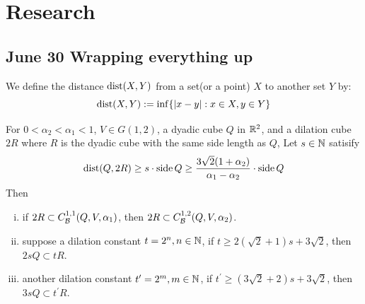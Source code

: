 \section{Research}


\subsection{June 30 Wrapping everything up}
\begin{definition}[Distance]
    We define the distance $\operatorname{dist}(X, Y)$ from a set(or a point) $X$ to another set $Y$ by:
    \begin{equation*}
        \operatorname{dist}(X, Y) := \inf\{|x-y|:x\in X, y\in Y\}
    \end{equation*}
\end{definition}

\begin{lemma}\label{lemma:s-guarantee-containQ-between-2alpha}
    For $0<\alpha_2<\alpha_1<1$, $V\in G(1, 2)$, a dyadic cube $Q$ in $\mathbb{R}^2$, and a dilation cube $2R$ where $R$ is the dyadic cube with the same side length as $Q$, Let $s\in\mathbb{N}$ satisify
    \begin{equation}
        \operatorname{dist}(Q, 2R)\geq s\cdot \operatorname{side} Q \geq \frac{3\sqrt{2}(1+\alpha_2)}{\alpha_1-\alpha_2}\cdot \operatorname{side} Q
    \end{equation}
    Then
    \begin{enumerate}[(i)]
        \item \label{lemma-1:s-guarantee-containQ-between-2alpha} if $2R\subset C_\mathcal B^{1,1}(Q, V, \alpha_1)$, then $2R\subset  C_\mathcal B^{1,2}(Q, V, \alpha_2)$.
        \item \label{lemma-2:s-guarantee-containQ-between-2alpha} suppose a dilation constant $t = 2^n, n\in\mathbb{N}$, if $t\geq 2(\sqrt{2}+1)s + 3\sqrt{2}$, then $2sQ\subset tR $.
        \item \label{lemma-3:s-guarantee-containQ-between-2alpha} another dilation constant $t^\prime = 2^m, m\in\mathbb{N}$, if $t^\prime \geq (3\sqrt{2}+2)s + 3\sqrt{2}$, then $3sQ\subset t^\prime R$.
    \end{enumerate}
\end{lemma}
